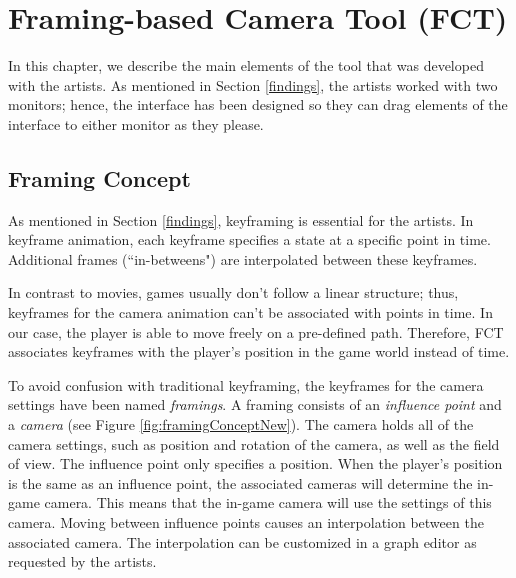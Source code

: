 \begin{verbatim}

\end{verbatim}

\section{Framing-based Camera Tool (FCT)}
In this chapter, we describe the main elements of the tool that was developed with the artists. As mentioned in Section \ref{findings}, the artists worked with two monitors; hence, the interface has been designed so they can drag elements of the interface to either monitor as they please.

\subsection{Framing Concept}
As mentioned in Section \ref{findings}, keyframing is essential for the artists. In keyframe animation, each keyframe specifies a state at a specific point in time. Additional frames (``in-betweens") are interpolated between these keyframes.



In contrast to movies, games usually don't follow a linear structure; thus, keyframes for the camera animation can't be associated with points in time. In our case, the player is able to move freely on a pre-defined path. Therefore, FCT associates keyframes with the player's position in the game world instead of time.

To avoid confusion with traditional keyframing, the keyframes for the camera settings have been named \textit{framings}. A framing consists of an \textit{influence point} and a \textit{camera} (see Figure \ref{fig:framingConceptNew}). The camera holds all of the camera settings, such as position and rotation of the camera, as well as the field of view. The influence point only specifies a position. When the player's position is the same as an influence point, the associated cameras will determine the in-game camera. This means that the in-game camera will use the settings of this camera. Moving between influence points causes an interpolation between the associated camera. The interpolation can be customized in a graph editor as requested by the artists.


